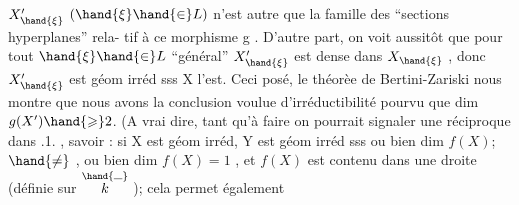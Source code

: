 $X'_{\hand{\xi}}$  $(\hand{\xi}\hand{\in} L)$  n'est autre que la famille des ``sections hyperplanes'' rela-%
tif à ce morphisme  g . D'autre part, on voit aussitôt que pour tout
$\hand{\xi}\hand{\in} L$  ``général''  $X'_{\hand{\xi}}$ est dense dans $X_{\hand{\xi}}$ , donc  $X'_{\hand{\xi}}$  est géom irréd sss
X  l'est.  Ceci posé,  le théorèe de Bertini-Zariski nous montre que
nous avons la conclusion voulue  d'irréductibilité pourvu que
dim $g(X') \hand{\geqslant} 2$. (A vrai dire, tant qu'à faire on pourrait signaler une
réciproque dans .1. , savoir :  si X est géom irréd, Y  est
géom irréd sss  ou bien  dim $f(X)$; $\hand{\neq}$ , ou bien  dim $f(X)=1$ , et $f(X)$
est contenu dans une droite (définie sur $\overset{\hand{\rule{0.6em}{0.35pt}}}{k}$ )\hand{)}; cela permet également


